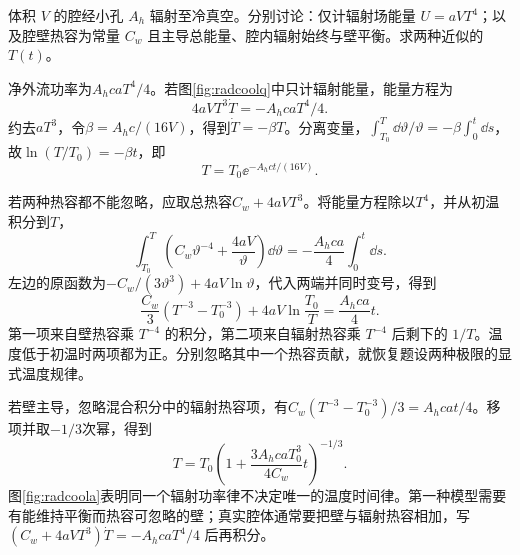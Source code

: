 \begin{exercise}[辐射腔冷却的两种热容]
体积 $V$ 的腔经小孔 $A_h$ 辐射至冷真空。分别讨论：仅计辐射场能量 $U=aVT^4$；以及腔壁热容为常量 $C_w$ 且主导总能量、腔内辐射始终与壁平衡。求两种近似的 $T(t)$。
\end{exercise}
\begin{solution}
净外流功率为$A_hcaT^4/4$。若图\ref{fig:radcoolq}中只计辐射能量，能量方程为
\[
 4aVT^3\dot T=-A_hcaT^4/4.
\]
约去$aT^3$，令$\beta=A_hc/(16V)$，得到$\dot T=-\beta T$。分离变量，$\int_{T_0}^T\dd\vartheta/\vartheta=-\beta\int_0^t\dd s$，故$\ln(T/T_0)=-\beta t$，即
\[
 T=T_0\ee^{-A_hct/(16V)}.
\]

若两种热容都不能忽略，应取总热容$C_w+4aVT^3$。将能量方程除以$T^4$，并从初温积分到$T$，
\[
 \int_{T_0}^{T}\left(C_w\vartheta^{-4}+\frac{4aV}{\vartheta}\right)\dd\vartheta
 =-\frac{A_hca}{4}\int_0^t\dd s.
\]
左边的原函数为$-C_w/(3\vartheta^3)+4aV\ln\vartheta$，代入两端并同时变号，得到
\[
 \frac{C_w}{3}(T^{-3}-T_0^{-3})
 +4aV\ln\frac{T_0}{T}=\frac{A_hca}{4}t.
\]
第一项来自壁热容乘 $T^{-4}$ 的积分，第二项来自辐射热容乘 $T^{-4}$ 后剩下的 $1/T$。温度低于初温时两项都为正。分别忽略其中一个热容贡献，就恢复题设两种极限的显式温度规律。

若壁主导，忽略混合积分中的辐射热容项，有$C_w(T^{-3}-T_0^{-3})/3=A_hcat/4$。移项并取$-1/3$次幂，得到
\[
 T=T_0\left(1+\frac{3A_hcaT_0^3}{4C_w}t\right)^{-1/3}.
\]
图\ref{fig:radcoola}表明同一个辐射功率律不决定唯一的温度时间律。第一种模型需要有能维持平衡而热容可忽略的壁；真实腔体通常要把壁与辐射热容相加，写 $(C_w+4aVT^3)\dot T=-A_hcaT^4/4$ 后再积分。
\end{solution}

